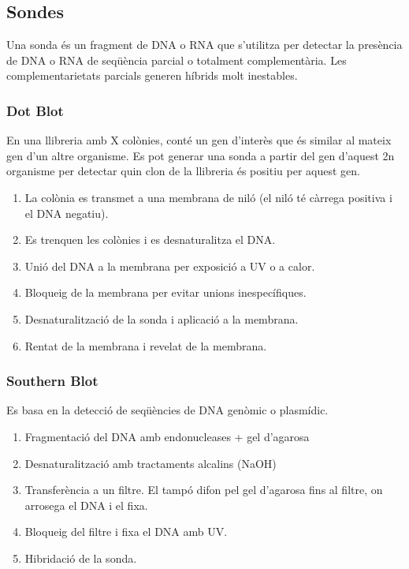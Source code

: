 \subsection{Sondes}
Una sonda és un fragment de DNA o RNA que s'utilitza per detectar la
presència de DNA o RNA de seqüència parcial o totalment
complementària. Les complementarietats parcials generen híbrids molt
inestables.

\subsubsection{Dot Blot}
\label{sec:dot-blot}
En una llibreria amb X colònies, conté un gen d'interès que és similar
al mateix gen d'un altre organisme. Es pot generar una sonda a partir
del gen d'aquest 2n organisme per detectar quin clon de la llibreria
és positiu per aquest gen.

\begin{enumerate}
\item La colònia es transmet a una membrana de niló (el niló té
  càrrega positiva i el DNA negatiu).
\item Es trenquen les colònies i es desnaturalitza el DNA.
\item Unió del DNA a la membrana per exposició a UV o a calor.
\item Bloqueig de la membrana per evitar unions inespecífiques.
\item Desnaturalització de la sonda i aplicació a la membrana.
\item Rentat de la membrana i revelat de la membrana.
\end{enumerate}

\subsubsection{Southern Blot}
\label{sec:southern-blot}
Es basa en la detecció de seqüències de DNA genòmic o plasmídic.
\begin{enumerate}
\item Fragmentació del DNA amb endonucleases + gel d'agarosa
\item Desnaturalització amb tractaments alcalins (NaOH)
\item Transferència a un filtre. El tampó difon pel gel d'agarosa fins
  al filtre, on arrosega el DNA i el fixa.
\item Bloqueig del filtre i fixa el DNA amb UV.
\item Hibridació de la sonda.
\end{enumerate}

